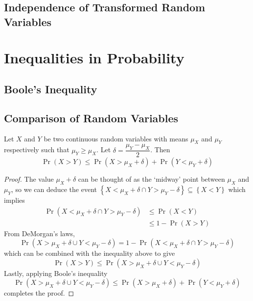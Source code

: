 \documentclass[11pt]{report} %
\begin{document}
\subsection{Independence of Transformed Random Variables}

\section{Inequalities in Probability}

\subsection{Boole's Inequality}

\subsection{Comparison of Random Variables}

\begin{theorem}
Let $X$ and $Y$ be two continuous random variables with means $\mu_{X}$ and $\mu_{Y}$ respectively such that $\mu_{Y} \geq \mu_{X}$. Let $\delta = \dfrac{\mu_{Y} - \mu_{X}}{2}$. Then
\begin{equation}
\operatorname{Pr}\left(X > Y\right) \leq \operatorname{Pr}\left(X > \mu_{X} + \delta\right) + \operatorname{Pr}\left(Y < \mu_{Y} + \delta\right)
\end{equation}
\end{theorem}
\begin{proof}
The value $\mu_{X} + \delta$ can be thought of as the `midway' point between $\mu_{X}$ and $\mu_{Y}$, so we can deduce the event $\left\{X < \mu_{X} + \delta \cap Y > \mu_{Y} - \delta\right\} \subseteq \left\{X <  Y\right\}$ which implies
\begin{align}
\operatorname{Pr}\left(X < \mu_{X} + \delta \cap Y > \mu_{Y} - \delta\right) &\leq \operatorname{Pr}\left(X < Y\right) \\
&\leq 1 - \operatorname{Pr}\left(X > Y\right)
\end{align}
From DeMorgan's laws,
\begin{equation}
\operatorname{Pr}\left(X > \mu_{X} + \delta \cup Y < \mu_{Y} - \delta\right) = 1 - \operatorname{Pr}\left(X < \mu_{X} + \delta \cap Y > \mu_{Y} - \delta\right)
\end{equation}
which can be combined with the inequality above to give
\begin{equation}
\operatorname{Pr}\left(X > Y\right) \leq \operatorname{Pr}\left(X > \mu_{X} + \delta \cup Y < \mu_{Y} - \delta\right)
\end{equation}
Lastly, applying Boole's inequality
\begin{equation}
\operatorname{Pr}\left(X > \mu_{X} + \delta \cup Y < \mu_{Y} - \delta\right) \leq \operatorname{Pr}\left(X > \mu_{X} + \delta\right) + \operatorname{Pr}\left(Y < \mu_{Y} + \delta\right)
\end{equation}
completes the proof.
\end{proof}
\end{document}
